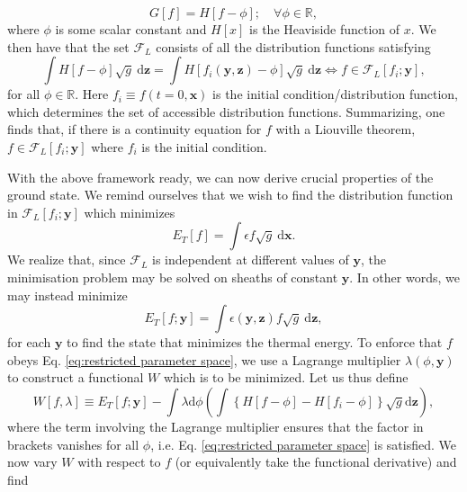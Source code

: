 \begin{equation}
    G[f] = H[f-\phi]; \quad \forall \phi \in \mathbb{R},
    \label{eq: casimir inv.}
\end{equation}
where $\phi$ is some scalar constant and $H[x]$ is the Heaviside function of $x$. We then have that the set $\mathcal{F}_L$ consists of all the distribution functions satisfying
\begin{equation}
    \int H[f - \phi]  \sqrt{g} \: \mathrm{d} \boldsymbol{z} = \int H[f_i(\boldsymbol{y},\boldsymbol{z})-\phi] \sqrt{g} \: \mathrm{d} \boldsymbol{z} \iff f \in \mathcal{F}_L[f_i;\boldsymbol{y}],
    \label{eq:restricted parameter space}
\end{equation}
for all $\phi \in \mathbb{R}$. Here $f_i\equiv f(t=0,\boldsymbol{x})$ is the initial condition/distribution function, which determines the set of accessible distribution functions. Summarizing, one finds that, if there is a continuity equation for $f$ with a Liouville theorem, $f \in \mathcal{F}_L[f_i;\boldsymbol{y}]$ where $f_i$ is the initial condition. \par 
With the above framework ready, we can now derive crucial properties of the ground state. We remind ourselves that we wish to find the distribution function in $\mathcal{F}_L[f_i;\boldsymbol{y}]$ which minimizes
\begin{equation}
    E_T[f] = \int \epsilon f \sqrt{g} \: \mathrm{d} \boldsymbol{x}.
\end{equation}
We realize that, since $\mathcal{F}_L$ is independent at different values of $\boldsymbol{y}$, the minimisation problem may be solved on sheaths of constant $\boldsymbol{y}$. In other words, we may instead minimize
\begin{equation}
    E_T[f;\boldsymbol{y}]= \int \epsilon(\boldsymbol{y},\boldsymbol{z}) f \sqrt{g} \: \mathrm{d}\boldsymbol{z},
\end{equation}
for each $\boldsymbol{y}$ to find the state that minimizes the thermal energy. To enforce that $f$ obeys Eq. \eqref{eq:restricted parameter space}, we use a Lagrange multiplier $\lambda(\phi,\boldsymbol{y})$ to construct a functional $W$ which is to be minimized. Let us thus define
\begin{equation}
    W[f,\lambda] \equiv E_T[f;\boldsymbol{y}] - \int \lambda\mathrm{d} \phi \left( \int \left\{ H[f - \phi]- H[f_i - \phi] \right\}\sqrt{g}  \mathrm{d} \boldsymbol{z} \right),
\end{equation}
where the term involving the Lagrange multiplier ensures that the factor in brackets vanishes for all $\phi$, i.e. Eq. \eqref{eq:restricted parameter space} is satisfied. We now vary $W$ with respect to $f$ (or equivalently take the functional derivative) and find
